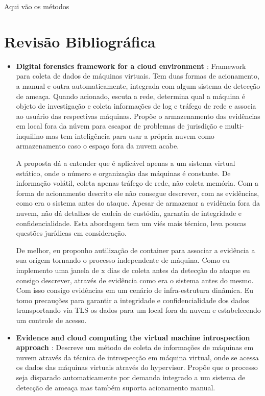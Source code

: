 \documentclass[
	12pt,				%
	openright,			%
	oneside,			%
	a4paper,			%
	english,			%
	french,				%
	spanish,			%
	brazil,				%
	]{abntex2}
\begin{document}
Aqui vão os métodos

\chapter{Revisão Bibliográfica}

\begin{itemize}

\item \textbf{Digital forensics framework for a cloud environment \cite{George2012} }: Framework para coleta de dados de máquinas virtuais. Tem duas formas de acionamento,
a manual e outra automaticamente, integrada com algum sistema de detecção de ameaça. Quando acionado, escuta a rede, determina qual a máquina é objeto de investigação e 
coleta informações de log e tráfego de rede e associa ao usuário das respectivas máquinas. Propõe o armazenamento das evidências em local fora da núvem para escapar de 
problemas de jurisdição e multi-inquilino mas tem inteligência para usar a própria nuvem como armazenamento caso o espaço fora da nuvem acabe.

A proposta dá a entender que é aplicável apenas a um sistema virtual estático, onde o número e organização das máquinas é constante. De informação volátil, coleta apenas 
tráfego de rede, não coleta memória. Com a forma de acionamento descrito ele não consegue descrever, com as evidências, como era o sistema antes do ataque. Apesar de armazenar 
a evidëncia fora da nuvem, não dá detalhes de cadeia de custódia, garantia de integridade e confidencialidade. Esta abordagem tem um viés mais técnico, leva poucas questões
jurídicas em consideração.

De melhor, eu proponho autilização de container para associar a evidência a sua origem tornando o processo independente de máquina. Como eu implemento uma janela de x dias
de coleta antes da detecção do ataque eu consigo descrever, através de evidência como era o sistema antes do mesmo. Com isso consigo evidências em um cenário
de infra-estrutura dinâmica. Eu tomo precauções para garantir a integridade e confidencialidade dos dados transportando via TLS os dados para um local fora da nuvem e 
estabelecendo um controle de acesso.\\
 
\item \textbf{Evidence and cloud computing the virtual machine introspection approach \cite{Poisel2013} }: Descreve um método de coleta de informações de máquinas
em nuvem através da técnica de introspecção em máquina virtual, onde se acessa os dados das máquinas virtuais através do hypervisor. Propõe que o processo seja disparado
automaticamente por demanda integrado a um sistema de detecção de ameaça mas também suporta acionamento manual.


\end{itemize}
\end{document}
